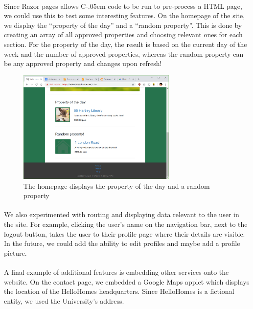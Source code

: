 \documentclass{article}
\newcommand{\Csharp}{%
  {\settoheight{\dimen0}{C}C\kern-.05em \resizebox{!}{\dimen0}{\raisebox{\depth}{\#}}}}
\begin{document}
        \paragraph{}
            Since Razor pages allows \Csharp\space code to be run to pre-process a HTML page, we could use this to test some interesting features.
            On the homepage of the site, we display the “property of the day” and a “random property”.
            This is done by creating an array of all approved properties and choosing relevant ones for each section.
            For the property of the day, the result is based on the current day of the week and the number of approved properties, whereas the random property can be any approved property and changes upon refresh!

            \begin{figure}[!htb]
                \centering
                \includegraphics[width=0.7\textwidth]{figures/property_of_the_day.png}
                \caption[Property Of The Day]{The homepage displays the property of the day and a random property}
            \end{figure}

        \paragraph{}
            We also experimented with routing and displaying data relevant to the user in the site.
            For example, clicking the user’s name on the navigation bar, next to the logout button, takes the user to their profile page where their details are visible.
            In the future, we could add the ability to edit profiles and maybe add a profile picture.

        \paragraph{}
            A final example of additional features is embedding other services onto the website.
            On the contact page, we embedded a Google Maps applet which displays the location of the HelloHomes headquarters.
            Since HelloHomes is a fictional entity, we used the University's address.
\end{document}
